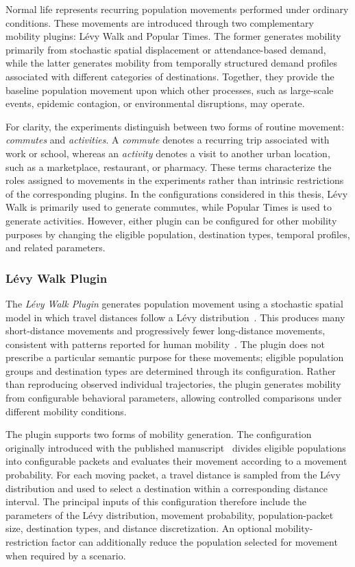 Normal life represents recurring population movements performed under ordinary conditions. These movements are introduced through two complementary mobility plugins: L\'evy Walk and Popular Times. The former generates mobility primarily from stochastic spatial displacement or attendance-based demand, while the latter generates mobility from temporally structured demand profiles associated with different categories of destinations. Together, they provide the baseline population movement upon which other processes, such as large-scale events, epidemic contagion, or environmental disruptions, may operate.

For clarity, the experiments distinguish between two forms of routine movement: \textit{commutes} and \textit{activities}. A \textit{commute} denotes a recurring trip associated with work or school, whereas an \textit{activity} denotes a visit to another urban location, such as a marketplace, restaurant, or pharmacy. These terms characterize the roles assigned to movements in the experiments rather than intrinsic restrictions of the corresponding plugins. 
In the configurations considered in this thesis, L\'evy Walk is primarily used to generate commutes, while Popular Times is used to generate activities. However, either plugin can be configured for other mobility purposes by changing the eligible population, destination types, temporal profiles, and related parameters.


\subsubsection{L\'evy Walk Plugin} 
\label{sec:levy_walk_plugin_inputs}

The \textit{L\'evy Walk Plugin} generates population movement using a stochastic spatial model in which travel distances follow a L\'evy distribution~\cite{levy_flight}. This produces many short-distance movements and progressively fewer long-distance movements, consistent with patterns reported for human mobility~\cite{gonzalez2008understanding}. The plugin does not prescribe a particular semantic purpose for these movements; eligible population groups and destination types are determined through its configuration. 
Rather than reproducing observed individual trajectories, the plugin generates mobility from configurable behavioral parameters, allowing controlled comparisons under different mobility conditions.

The plugin supports two forms of mobility generation. The configuration originally introduced with the published manuscript~\cite{silva2026lodusPop} divides eligible populations into configurable packets and evaluates their movement according to a movement probability. For each moving packet, a travel distance is sampled from the L\'evy distribution and used to select a destination within a corresponding distance interval. The principal inputs of this configuration therefore include the parameters of the L\'evy distribution, movement probability, population-packet size, destination types, and distance discretization. An optional mobility-restriction factor can additionally reduce the population selected for movement when required by a scenario.

